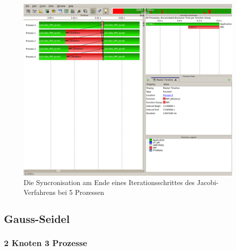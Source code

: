 \documentclass[a4paper,12pt]{scrartcl}
\begin{document}
\begin{figure}[hr!]
 \includegraphics[scale=0.45]{./5_4_JA/Syncronize.png}
 \caption{Die Syncronisation am Ende eines Iterationsschrittes des Jacobi-Verfahrens bei 5 Prozessen}
\end{figure}

\newpage
\FloatBarrier
\subsection{Gauss-Seidel}
\subsubsection{2 Knoten 3 Prozesse}
\end{document}
